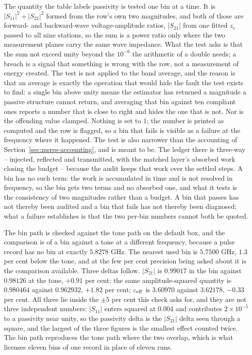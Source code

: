 The quantity the table labels passivity is tested one bin at a time. It is $|S_{11}|^2 + |S_{21}|^2$ formed from
the row's own two magnitudes, and both of those are forward- and backward-wave voltage-amplitude ratios,
$|S_{21}|$ from one fitted $z_c$ passed to all nine stations, so the sum is a power ratio only where the two measurement planes carry the same wave impedance. What the test asks is that the sum not exceed unity beyond the $10^{-6}$ the arithmetic of a double needs; a breach is a signal that something is wrong with the row, not a measurement of energy created. The test is not applied to the band average, and the reason is that an average is exactly the operation that
would hide the fault the test exists to find: a single bin above unity means the estimator has returned a magnitude
a passive structure cannot return, and averaging that bin against ten compliant ones reports a number that is close
to right and hides the one that is not. Nor is the offending value clamped. Nothing is set to $1$; the number is
printed as computed and the row is flagged, so a bin that fails is visible as a failure at the frequency where it
happened. The test is also narrower than the accounting of Section~\ref{sec:msres-accounting}, and is meant to be.
The ledger there is three-way -- injected, reflected and transmitted, with the matched layer's absorbed work closing
the budget -- because the audit keeps that work over the settled steps. A bin has no such term: the work is
accumulated in time and is not resolved in frequency, so the bin gets two terms and no absorbed one, and what it
tests is the consistency of two magnitudes rather than a budget. A bin that passes has not thereby been audited and
a bin that fails has not thereby been diagnosed; what a failure establishes is that the two per-bin numbers cannot
both be quoted.

The bin path is checked against the tone path on the default box, and the comparison is of a bin against a tone
at a different frequency, because a pulse record has no bin at exactly $5.8278$ GHz. The nearest used bin is
$5.7500$ GHz, $1.3$ per cent below the tone, and at the few per cent precision being asked about it is the
comparison available. Three deltas follow. $|S_{21}|$ is $0.99017$ in the bin against $0.98126$ at the tone,
$+0.91$ per cent; the same amplitude-squared quantity is $0.980464$ against $0.962932$, $+1.82$ per cent; $\varepsilon_{\mathrm{eff}}$ is
$3.60970$ against $3.62178$, $-0.33$ per cent. All three lie inside the $\pm5$ per cent this check asks for, and
they are not three independent numbers: $|S_{11}|$ enters squared at $0.004$ and contributes $2\times10^{-5}$ to a
passivity near unity, so the passivity delta is the $|S_{21}|$ delta seen through a square, and the largest of the
three figures is the smallest effect counted twice. The bin path reproduces the tone path where the two overlap,
which is what licenses eleven bins of one record in place of eleven runs.

